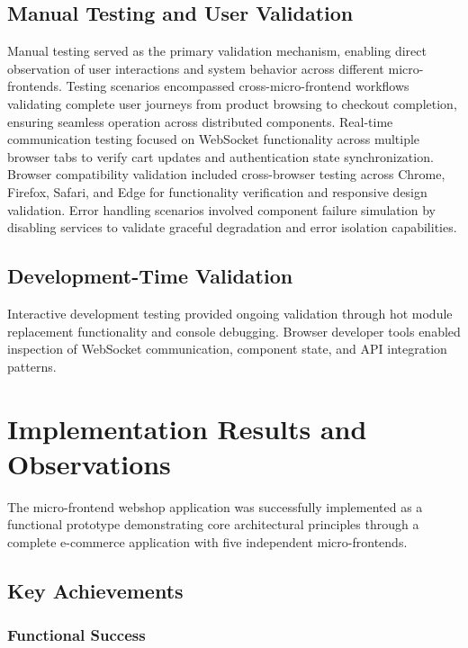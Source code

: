 \documentclass[12pt,a4paper]{report}
\begin{document}
\subsection{Manual Testing and User Validation}

Manual testing served as the primary validation mechanism, enabling direct observation of user interactions and system behavior across different micro-frontends. Testing scenarios encompassed cross-micro-frontend workflows validating complete user journeys from product browsing to checkout completion, ensuring seamless operation across distributed components. Real-time communication testing focused on WebSocket functionality across multiple browser tabs to verify cart updates and authentication state synchronization. Browser compatibility validation included cross-browser testing across Chrome, Firefox, Safari, and Edge for functionality verification and responsive design validation. Error handling scenarios involved component failure simulation by disabling services to validate graceful degradation and error isolation capabilities.

\subsection{Development-Time Validation}

Interactive development testing provided ongoing validation through hot module replacement functionality and console debugging. Browser developer tools enabled inspection of WebSocket communication, component state, and API integration patterns.

\section{Implementation Results and Observations}

The micro-frontend webshop application was successfully implemented as a functional prototype demonstrating core architectural principles through a complete e-commerce application with five independent micro-frontends.

\subsection{Key Achievements}

\subsubsection{Functional Success}
\end{document}
